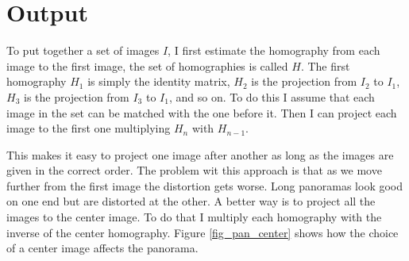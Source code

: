 \documentclass[12pt]{article}
\begin{document}
\section{Output}

To put together a set of images $I$, I first estimate the homography from each image to the first image, the set of homographies is called $H$. The first homography $H_1$ is simply the identity matrix, $H_2$ is the projection from $I_2$ to $I_1$, $H_3$ is the projection from $I_3$ to $I_1$, and so on. To do this I assume that each image in the set can be matched with the one before it. Then I can project each image to the first one multiplying $H_n$ with $H_{n-1}$. 

This makes it easy to project one image after another as long as the images are given in the correct order. The problem wit this approach is that as we move further from the first image the distortion gets worse. Long panoramas look good on one end but are distorted at the other. A better way is to project all the images to the center image. To do that I multiply each homography with the inverse of the center homography. Figure \ref{fig_pan_center} shows how the choice of a center image affects the panorama.
\end{document}

